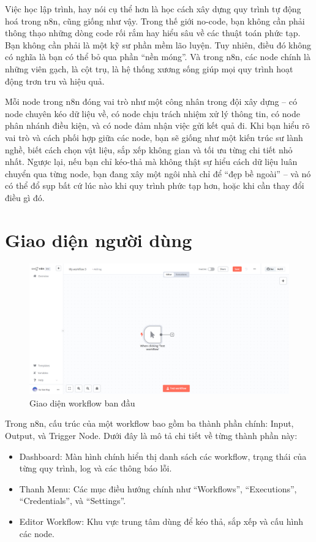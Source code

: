 Việc học lập trình, hay nói cụ thể hơn là học cách xây dựng quy trình tự động hoá trong n8n, cũng giống như vậy. Trong thế giới no-code, bạn không cần phải thông thạo những dòng code rối rắm hay hiểu sâu về các thuật toán phức tạp. Bạn không cần phải là một kỹ sư phần mềm lão luyện. Tuy nhiên, điều đó không có nghĩa là bạn có thể bỏ qua phần “nền móng”. Và trong n8n, các node chính là những viên gạch, là cột trụ, là hệ thống xương sống giúp mọi quy trình hoạt động trơn tru và hiệu quả.

Mỗi node trong n8n đóng vai trò như một công nhân trong đội xây dựng – có node chuyên kéo dữ liệu về, có node chịu trách nhiệm xử lý thông tin, có node phân nhánh điều kiện, và có node đảm nhận việc gửi kết quả đi. Khi bạn hiểu rõ vai trò và cách phối hợp giữa các node, bạn sẽ giống như một kiến trúc sư lành nghề, biết cách chọn vật liệu, sắp xếp không gian và tối ưu từng chi tiết nhỏ nhất. Ngược lại, nếu bạn chỉ kéo-thả mà không thật sự hiểu cách dữ liệu luân chuyển qua từng node, bạn đang xây một ngôi nhà chỉ để “đẹp bề ngoài” – và nó có thể đổ sụp bất cứ lúc nào khi quy trình phức tạp hơn, hoặc khi cần thay đổi điều gì đó.
\newpage

\section{Giao diện người dùng}

\begin{figure}[htbp]
    \centering
    \includegraphics[width=1\linewidth]{Chap1-7/giaodien.png}
    \caption{Giao diện workflow ban đầu}
\end{figure}


Trong n8n, cấu trúc của một workflow bao gồm ba thành phần chính: Input, Output, và Trigger Node. Dưới đây là mô tả chi tiết về từng thành phần này:

\begin{itemize}
    \item Dashboard: Màn hình chính hiển thị danh sách các workflow, trạng thái của từng quy trình, log và các thông báo lỗi.
    \item Thanh Menu: Các mục điều hướng chính như  “Workflows”, “Executions”, “Credentials”, và “Settings”.
    \item Editor Workflow: Khu vực trung tâm dùng để kéo thả, sắp xếp và cấu hình các node.
\end{itemize}

